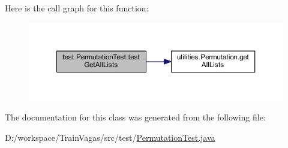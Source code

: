 Here is the call graph for this function\+:\nopagebreak
\begin{figure}[H]
\begin{center}
\leavevmode
\includegraphics[width=350pt]{classtest_1_1_permutation_test_ad01c13d2d87644ae4bef6cac6e937801_cgraph}
\end{center}
\end{figure}


The documentation for this class was generated from the following file\+:\begin{DoxyCompactItemize}
\item 
D\+:/workspace/\+Train\+Vagas/src/test/\hyperlink{_permutation_test_8java}{Permutation\+Test.\+java}\end{DoxyCompactItemize}

